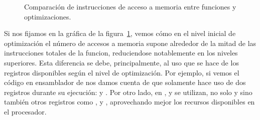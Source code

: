 \begin{figure}[htbp]
\begin{center}
\end{center}
\caption{Comparación de instrucciones de acceso a memoria entre funciones y optimizaciones.}
\label{graph:memoria}
\end{figure}

Si nos fijamos en la gráfica de la figura~\ref{graph:memoria}, vemos cómo en el nivel inicial de optimización el número de accesos a memoria supone alrededor de la mitad de las instrucciones totales de la funcion, reduciendose notablemente en los niveles superiores. Esta diferencia se debe, principalmente, al uso que se hace de los registros disponibles según el nivel de optimización. Por ejemplo, si vemos el código en ensamblador de  nos damos cuenta de que solamente hace uso de dos registros durante su ejecución:  y . Por otro lado, en ,  y  se utilizan, no solo  y  sino también otros registros como ,  y , aprovechando mejor los recursos disponibles en el procesador.


